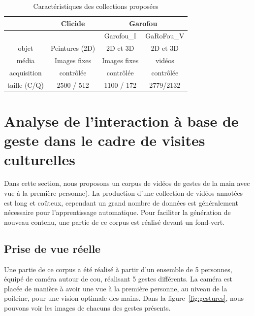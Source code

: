 \begin{table}[htb]
    \centering
    \begin{tabular}{| c || c | c | c |}
    \hline 
    & Clicide & \multicolumn{2}{|c|}{Garofou} \\
    \hline
    &  & Garofou\_I & GaRoFou\_V \\
    \hline 
    \hline
    objet & Peintures (2D) & 2D et 3D &  2D et 3D \\
    \hline    
    média & Images fixes & Images fixes  & vidéos \\
    \hline
    acquisition & contrôlée &  contrôlée  &  contrôlée \\
    \hline
    taille (C/Q) & 2500 / 512 & 1100 / 172 & 2779/2132 \\
    \hline
    \end{tabular}
    \caption{Caractéristiques des collections proposées}
    \label{tab:recap_corpus}
\end{table}


%
%
\section{Analyse de l'interaction à base de geste dans le cadre de visites culturelles}
\label{sec:corpusGestes}

Dans cette section, nous proposons un corpus de vidéos de gestes de la main avec vue à la première personne).
La production d'une collection de vidéos annotées est long et coûteux, cependant un grand nombre de données est généralement nécessaire pour l’apprentissage automatique.
Pour faciliter la génération de nouveau contenu, une partie de ce corpus est réalisé devant un fond-vert.




\subsection{Prise de vue réelle}

Une partie de ce corpus a été réalisé à partir d’un ensemble de 5 personnes, équipé de caméra autour de cou, réalisant 5 gestes différents.
La caméra est placée de manière à avoir une vue à la première personne, au niveau de la poitrine, pour une vision optimale des mains.
Dans la figure~\ref{fig:gestures}, nous pouvons voir les images de chacuns des gestes présents.

